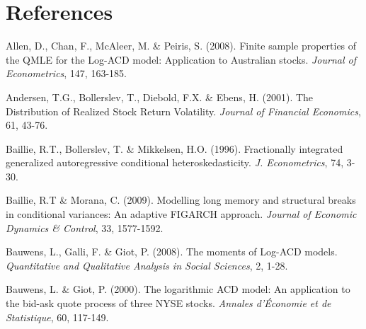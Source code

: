 \documentclass[12pt]{article}
\begin{document}
\section*{References}
\begin{description}

\item
Allen, D., Chan, F., McAleer, M. \& Peiris, S. (2008). Finite sample properties of the QMLE for the Log-ACD model: Application to Australian stocks. \textsl{Journal of Econometrics}, 147, 163-185.


\item
Andersen, T.G., Bollerslev, T., Diebold, F.X. \& Ebens, H. (2001). The Distribution of Realized Stock Return Volatility. \textsl{Journal of Financial Economics}, 61, 43-76.




\item
Baillie, R.T., Bollerslev, T. \& Mikkelsen, H.O. (1996). Fractionally integrated generalized autoregressive conditional heteroskedasticity. \textsl{J. Econometrics}, 74, 3-30.

\item
Baillie, R.T \& Morana, C. (2009). Modelling long memory and structural breaks in conditional variances: An adaptive FIGARCH approach. \textsl{Journal of Economic Dynamics \& Control}, 33, 1577-1592.

\item
Bauwens, L., Galli, F. \& Giot, P. (2008). The moments of Log-ACD models. \textsl{Quantitative and
Qualitative Analysis in Social Sciences}, 2, 1-28.


\item
Bauwens, L. \& Giot, P. (2000). The logarithmic ACD model: An application to the bid-ask quote process of three NYSE stocks. \textsl{Annales d'\'{E}conomie et de Statistique}, 60, 117-149.


\end{description}
\end{document}

